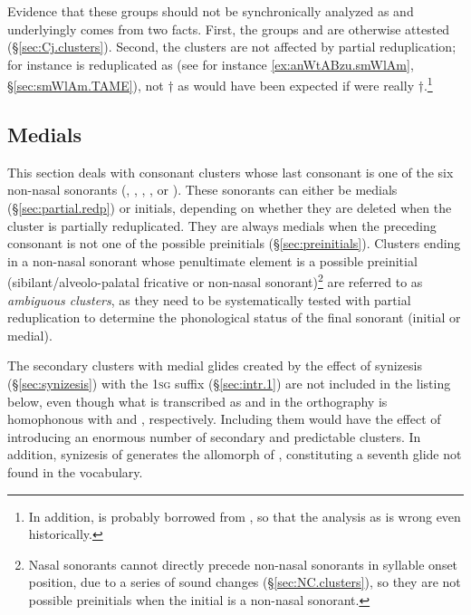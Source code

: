 Evidence that these groups should not be synchronically analyzed as  and  underlyingly comes from two facts. First, the groups  and  are otherwise attested (§\ref{sec:Cj.clusters}). Second, the clusters  are not affected by partial reduplication; for instance  is reduplicated as  (see for instance \ref{ex:anWtABzu.smWlAm}, §\ref{sec:smWlAm.TAME}), not $\dagger$ as would have been expected if  were really $\dagger$.\footnote{In addition,  is probably borrowed from , so that the analysis as  is wrong even historically.  }

\subsection{Medials} \label{sec:medials}
This section deals with consonant clusters whose last consonant is one of the six non-nasal sonorants (, , , ,  or ). These sonorants can either be medials (§\ref{sec:partial.redp}) or initials, depending on whether they are deleted when the cluster is partially reduplicated. They are always medials when the preceding consonant is not one of the possible preinitials (§\ref{sec:preinitials}). Clusters ending in a non-nasal sonorant whose penultimate element is a possible preinitial (sibilant/alveolo-palatal fricative or non-nasal sonorant)\footnote{Nasal sonorants  cannot directly precede non-nasal sonorants in syllable onset position, due to a series of sound changes (§\ref{sec:NC.clusters}), so they are not possible preinitials when the initial is a non-nasal sonorant.  } are referred to as \textit{ambiguous clusters}, as they need to be systematically tested with partial reduplication to determine the phonological status of the final sonorant (initial or medial).

The secondary clusters with medial glides created by the effect of synizesis (§\ref{sec:synizesis}) with the \textsc{1sg} suffix  (§\ref{sec:intr.1}) are not included in the listing below, even though what is transcribed as  and  in the orthography is homophonous with  and , respectively. Including them would have the effect of introducing an enormous number of secondary and predictable clusters. In addition, synizesis of  generates the  allomorph of , constituting a seventh glide not found in the vocabulary.


